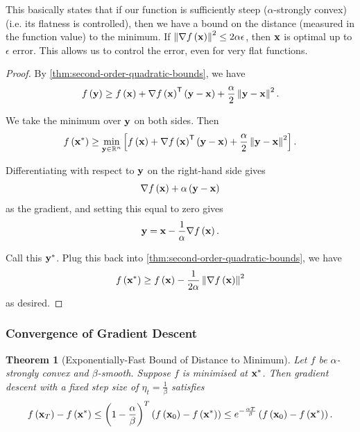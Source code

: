 \documentclass[11pt]{article}
\newtheorem{theorem}{Theorem}[section]
\theoremstyle{definition}
\theoremstyle{remark}
\newcommand{\pqty}[1]{\left(#1\right)}
\newcommand{\bqty}[1]{\left[#1\right]}
\newcommand{\flatfrac}[2]{\frac{#1}{#2}}
\newcommand{\RR}{\mathbb{R}}
\newcommand{\transpose}{^{\mathsf{T}}}
\newcommand{\grad}{\nabla}
\begin{document}
This basically states that if our function is sufficiently steep (\(\alpha\)-strongly convex) (i.e. its flatness is controlled), then we have a bound on the distance (measured in the function value) to the minimum. If \(\norm{\grad f\pqty{\vb{x}}}^2 \leq 2 \alpha \epsilon\), then \(\vb{x}\) is optimal up to \(\epsilon\) error. This allows us to control the error, even for very flat functions.

\begin{proof}
    By \autoref{thm:second-order-quadratic-bounds}, we have
    \[
        f\pqty{\vb{y}} \geq f\pqty{\vb{x}} + \grad f\pqty{\vb{x}}\transpose \pqty{\vb{y} - \vb{x}} + \frac{\alpha}{2} \norm{\vb{y} - \vb{x}}^2.
    \]

    We take the minimum over \(\vb{y}\) on both sides. Then
    \[
        f\pqty{\vb{x}^{\ast}} \geq \min_{\vb{y} \in \RR^n} \bqty{f\pqty{\vb{x}} + \grad f\pqty{\vb{x}}\transpose \pqty{\vb{y} - \vb{x}} + \frac{\alpha}{2} \norm{\vb{y} - \vb{x}}^2}.
    \]

    Differentiating with respect to \(\vb{y}\) on the right-hand side gives
    \[
        \grad f\pqty{\vb{x}} + \alpha \pqty{\vb{y} - \vb{x}}
    \]
    as the gradient, and setting this equal to zero gives
    \[
        \vb{y} = \vb{x} - \frac{1}{\alpha} \grad f\pqty{\vb{x}}.
    \]

    Call this \(\vb{y}^{\ast}\). Plug this back into \autoref{thm:second-order-quadratic-bounds}, we have
    \[
        f\pqty{\vb{x}^{\ast}} \geq f\pqty{\vb{x}} - \frac{1}{2\alpha} \norm{\grad f\pqty{\vb{x}}}^2
    \]
    as desired.
\end{proof}

\subsubsection{Convergence of Gradient Descent}

\begin{theorem}[Exponentially-Fast Bound of Distance to Minimum]\label{optim-unit-0016}
    \label{thm:exp-bound-dist-minimum}%
    Let \(f\) be \(\alpha\)-strongly convex and \(\beta\)-smooth. Suppose \(f\) is minimised at \(\vb{x}^{\ast}\). Then gradient descent with a fixed step size of \(\eta_t = \frac{1}{\beta}\) satisfies
    \[
        f\pqty{\vb{x}_T} - f\pqty{\vb{x}^{\ast}} \leq \pqty{1 - \frac{\alpha}{\beta}}^{T} \pqty{f\pqty{\vb{x}_0} - f\pqty{\vb{x}^{\ast}}} \leq e^{- \flatfrac{\alpha T}{\beta}} \pqty{f\pqty{\vb{x}_0} - f\pqty{\vb{x}^{\ast}}}.
    \]
\end{theorem}
\end{document}
